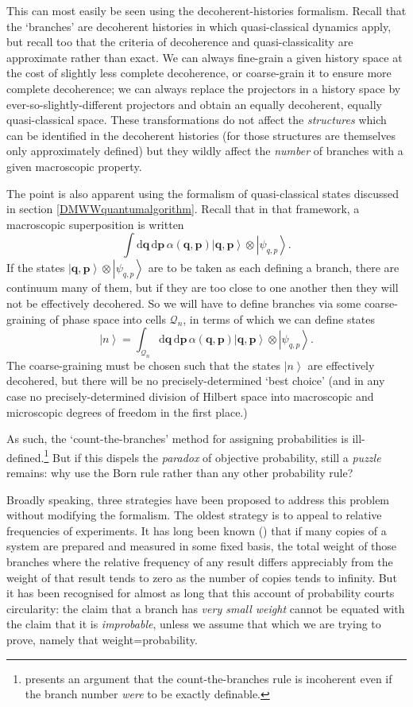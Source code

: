 \documentclass[12pt]{article}
\newcommand{\be}{\begin{equation}}
\newcommand{\ee}{\end{equation}}
\newcommand{\vctr}[1]{\ensuremath{\mathbf{ #1 }}}
\newcommand{\dr}[1]{\ensuremath{\mathrm{d} #1\,}}
\newcommand{\mc}[1]{\ensuremath{\mathcal{#1}}}
\newcommand{\ket}[1]{\ensuremath{\left|  #1 \right\rangle}}
\newcommand{\tpk}[2]{\ensuremath{\ket{#1}\!\otimes\!\ket{#2}}}
\begin{document}
This can most easily be seen using the decoherent-histories formalism. Recall that the `branches' are decoherent histories in which quasi-classical dynamics apply, but recall too that the criteria of decoherence and quasi-classicality are approximate rather than exact. We can always fine-grain a given history space at the cost of slightly less complete decoherence, or coarse-grain it to ensure more complete decoherence; we can always replace the projectors in a history space by ever-so-slightly-different projectors and obtain an equally decoherent, equally quasi-classical space. These transformations do not  affect the \emph{structures} which can be identified in the decoherent histories (for those structures are themselves only approximately defined) but they wildly affect the \emph{number} of branches with a given macroscopic property.

The point is also apparent using the formalism of quasi-classical states discussed in section \ref{DMWWquantumalgorithm}. Recall that in that framework, a macroscopic superposition is written
\be
\int \dr{\vctr{q}}\dr{\vctr{p}}\alpha(\vctr{q},\vctr{p})\tpk{\vctr{q},\vctr{p}}{\psi_{q,p}}.
\ee
If the states $\tpk{\vctr{q},\vctr{p}}{\psi_{q,p}}$ are to be taken as each defining a branch, there are continuum many of them, but if they are too close to one another then they will not be effectively decohered. So we will have to define branches via some coarse-graining of phase space into cells $\mc{Q}_n$, in terms of which we can define states
\be \ket{n}=\int_{\mc{Q}_n}\dr{\vctr{q}}\dr{\vctr{p}}\alpha(\vctr{q},\vctr{p})\tpk{\vctr{q},\vctr{p}}{\psi_{q,p}}.
\ee
The coarse-graining must be chosen such that the states \ket{n} are effectively decohered, but there will be no precisely-determined `best choice' (and in any case no precisely-determined division of Hilbert space into macroscopic and microscopic degrees of freedom in the first place.)

As such, the `count-the-branches' method for assigning probabilities is ill-defined.\footnote{ presents an argument that the count-the-branches rule is incoherent even if the branch number \emph{were} to be exactly definable.} But if this dispels the \emph{paradox} of objective probability, still a \emph{puzzle} remains: why use the Born rule rather than any other probability rule?

Broadly speaking, three strategies have been proposed to address this problem without modifying the formalism. The oldest strategy is to appeal to relative frequencies of experiments. It has long been known () that if many copies of a system are prepared and measured in some fixed basis, the total weight of those branches where the relative frequency of any result differs appreciably from the weight of that result tends to zero as the number of copies tends to infinity. But it has been recognised for almost as long that this account of probability courts circularity: the claim that a branch has \emph{very small weight} cannot be equated with the claim that it is \emph{improbable}, unless we assume that which we are trying to prove, namely that weight=probability.
\end{document}
